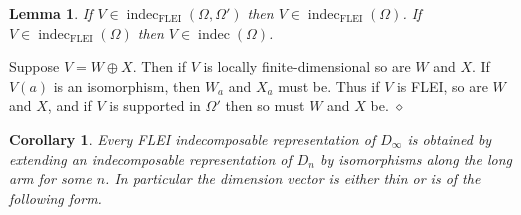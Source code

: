 \documentclass{article}
\newtheorem{lemma}{Lemma}[section]
\newtheorem{corollary}{Corollary}[section]
\newenvironment{proof}{\vspace*{2ex}\noindent {\em Proof:}
}{\hfill $\diamond$ \\[2ex]}
\begin{document}
\begin{lemma} \label{lem:indecomposables are the same } If $V \in \operatorname{indec}_{\text{FLEI}}(\Omega,\Omega')$ then  $V \in \operatorname{indec}_{\text{FLEI}}(\Omega)$. If $V \in \operatorname{indec}_{\text{FLEI}}(\Omega)$ then  $V \in \operatorname{indec}(\Omega)$.
\end{lemma}

\begin{proof}
    Suppose $V=W \oplus X$.  Then if $V$ is locally finite-dimensional so are $W$ and $X$.  If $V(a)$ is an isomorphism, then $W_a$ and $X_a$ must be.  Thus if $V$ is FLEI, so are $W$ and $X$, and if $V$ is supported in $\Omega'$ then so must $W$ and $X$ be. 
\end{proof}


\begin{corollary}\label{cor: flei indecomposables of D infinity}
    Every FLEI indecomposable representation of $D_\infty$ is obtained by extending an indecomposable representation of $D_n$ by isomorphisms along the long arm for some $n$. In particular the dimension vector is either thin or is of the following form.

\begin{center}
\end{center}

\begin{center}
\end{center}


\end{corollary}
    
\end{document}
